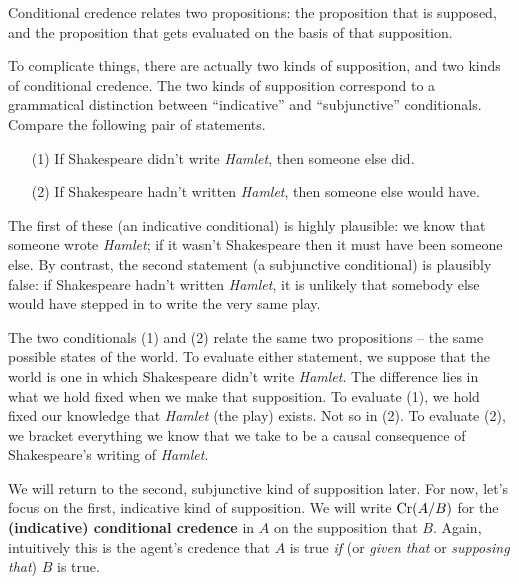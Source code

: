 Conditional credence relates two propositions: the proposition that
is supposed, and the proposition that gets evaluated on the basis of
that supposition.

To complicate things, there are actually two kinds of supposition, and
two kinds of conditional credence. The two kinds of supposition
correspond to a grammatical distinction between ``indicative'' and
``subjunctive'' conditionals. Compare the following pair of
statements.
%
\begin{itemize}
\item[(1)] If Shakespeare didn't write \emph{Hamlet}, then someone else did.
\item[(2)] If Shakespeare hadn't written \emph{Hamlet}, then someone else
  would have.
\end{itemize}
%
The first of these (an indicative conditional) is highly plausible: we
know that someone wrote \emph{Hamlet}; if it wasn't Shakespeare then it must
have been someone else. By contrast, the second statement (a
subjunctive conditional) is plausibly false: if Shakespeare hadn't
written \emph{Hamlet}, it is unlikely that somebody else would have stepped
in to write the very same play.

The two conditionals (1) and (2) relate the same two propositions --
the same possible states of the world. To evaluate either statement,
we suppose that the world is one in which Shakespeare didn't write
\emph{Hamlet}. The difference lies in what we hold fixed when we make
that supposition. To evaluate (1), we hold fixed our knowledge that
\emph{Hamlet} (the play) exists. Not so in (2). To evaluate (2), we
bracket everything we know that we take to be a causal consequence of
Shakespeare's writing of \emph{Hamlet}.


We will return to the second, subjunctive kind of supposition later.
For now, let's focus on the first, indicative kind of supposition.  We
will write $\text{Cr}(A/B)$ for the \textbf{(indicative) conditional
  credence} in $A$ on the supposition that $B$. Again, intuitively
this is the agent's credence that $A$ is true \emph{if} (or
\emph{given that} or \emph{supposing that}) $B$ is true.

